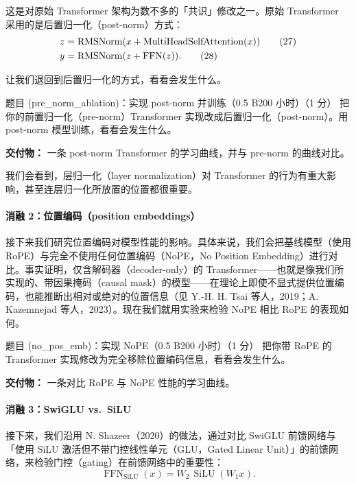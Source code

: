 
这是对原始 Transformer 架构为数不多的「共识」修改之一。原始 Transformer 采用的是后置归一化（post-norm）方式：
\begin{align*}
z &= \operatorname{RMSNorm}(x + \operatorname{MultiHeadSelfAttention}(x)) \tag{27} \\
y &= \operatorname{RMSNorm}(z + \operatorname{FFN}(z)). \tag{28}
\end{align*}

让我们退回到后置归一化的方式，看看会发生什么。

\begin{problembox}{题目 (pre\_norm\_ablation)：实现 post-norm 并训练（0.5 B200 小时）（1 分）}
把你的前置归一化（pre-norm）Transformer 实现改成后置归一化（post-norm）。用 post-norm 模型训练，看看会发生什么。

\begin{deliverablebox}
\textbf{交付物：} 一条 post-norm Transformer 的学习曲线，并与 pre-norm 的曲线对比。
\end{deliverablebox}
\end{problembox}

我们会看到，层归一化（layer normalization）对 Transformer 的行为有重大影响，甚至连层归一化所放置的位置都很重要。

\paragraph{消融 2：位置编码（position embeddings）}
接下来我们研究位置编码对模型性能的影响。具体来说，我们会把基线模型（使用 RoPE）与完全不使用任何位置编码（NoPE，No Position Embedding）进行对比。事实证明，仅含解码器（decoder-only）的 Transformer——也就是像我们所实现的、带因果掩码（causal mask）的模型——在理论上即使不显式提供位置编码，也能推断出相对或绝对的位置信息（见 Y.-H. H. Tsai 等人，2019；A. Kazemnejad 等人，2023）。现在我们就用实验来检验 NoPE 相比 RoPE 的表现如何。

\begin{problembox}{题目 (no\_pos\_emb)：实现 NoPE（0.5 B200 小时）（1 分）}
把你带 RoPE 的 Transformer 实现修改为完全移除位置编码信息，看看会发生什么。

\begin{deliverablebox}
\textbf{交付物：} 一条对比 RoPE 与 NoPE 性能的学习曲线。
\end{deliverablebox}
\end{problembox}

\paragraph{消融 3：SwiGLU vs.\ SiLU}
接下来，我们沿用 N. Shazeer（2020）的做法，通过对比 SwiGLU 前馈网络与「使用 SiLU 激活但不带门控线性单元（GLU，Gated Linear Unit）」的前馈网络，来检验门控（gating）在前馈网络中的重要性：
\[
\operatorname{FFN}_{\mathrm{SiLU}}(x) = W_2\,\operatorname{SiLU}(W_1 x). \tag{29}
\]

